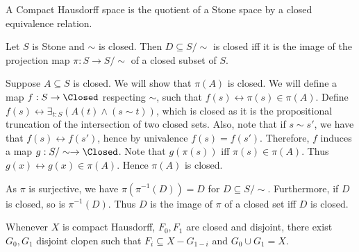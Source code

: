 \begin{definition}
  A Compact Hausdorff space is the quotient of a Stone space by a closed equivalence relation. 
\end{definition}


\begin{lemma}
Let $S$ is Stone and $\sim $ is closed. 
Then $D\subseteq S/\sim $ is closed iff 
it is the image of the projection map $\pi:S\to S/\sim$ of a closed subset of $S$. 
\end{lemma}
\begin{lemma}
%
  Suppose $A\subseteq S$ is closed. We will show that $\pi(A)$ is closed. 
  We will define a map $f:S\to \Closed$ respecting $\sim$, such that 
  $f(s) \leftrightarrow \pi(s) \in \pi(A)$.
  Define $f(s) \leftrightarrow \exists_{t:S} (A(t) \wedge (s \sim t))$, 
  which is closed as it is the propositional truncation of the intersection of two closed sets. 
  Also, note that if $s\sim s'$, we have that 
  $f(s) \leftrightarrow f(s')$, hence by univalence $f(s) = f(s')$. 
  Therefore, $f$ induces a map $g:S/\sim \to \Closed$.
  Note that $g(\pi(s))$ iff $\pi(s) \in \pi(A)$. 
  Thus 
  $g(x) \leftrightarrow g(x) \in \pi(A)$. 
  Hence $\pi(A)$ is closed. 

  As $\pi$ is surjective, we have $\pi(\pi^{-1}(D)) = D$ for $D\subseteq S/\sim$. 
  Furthermore, if $D$ is closed, so is $\pi^{-1}(D)$. 
  Thus $D$ is the image of $\pi$ of a closed set iff $D$ is closed. 
\end{lemma}






\begin{lemma}
  Whenever $X$ is compact Hausdorff, $F_0, F_1$ are closed and disjoint, 
  there exist $G_0, G_1$ disjoint clopen such that 
  $F_i \subseteq X - G_{1-i}$ and $G_0 \cup G_1 = X$. 
\end{lemma}






